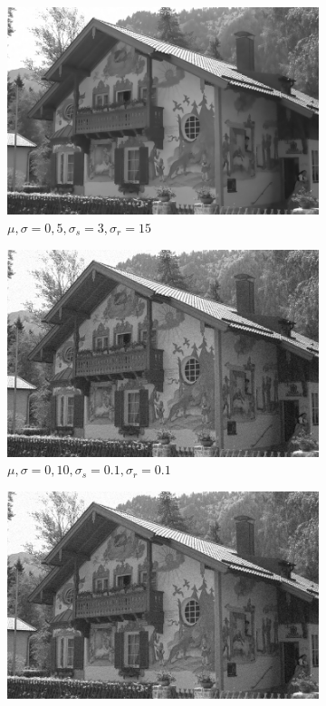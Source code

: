 \documentclass[a4paper, landscape]{article}
\begin{document}
\begin{figure}
\begin{subfigure}{0.33\linewidth}
        \includegraphics[width=\linewidth]{kodak24,σ_noise5,σ_spatial3,σ_range15.png}
        \caption{$\mu, \sigma = 0, 5, \sigma_s=3, \sigma_r=15$}
    \end{subfigure}
    \begin{subfigure}{0.33\linewidth}
        \centering
        \includegraphics[width=\linewidth]{kodak24,σ_noise10,σ_spatial0.1,σ_range0.1.png}
        \caption{$\mu, \sigma = 0, 10, \sigma_s=0.1, \sigma_r=0.1$}
    \end{subfigure}
    \begin{subfigure}{0.33\linewidth}
        \centering
        \includegraphics[width=\linewidth]{kodak24,σ_noise10,σ_spatial2,σ_range2.png}

\end{subfigure}
\end{figure}
\end{document}
